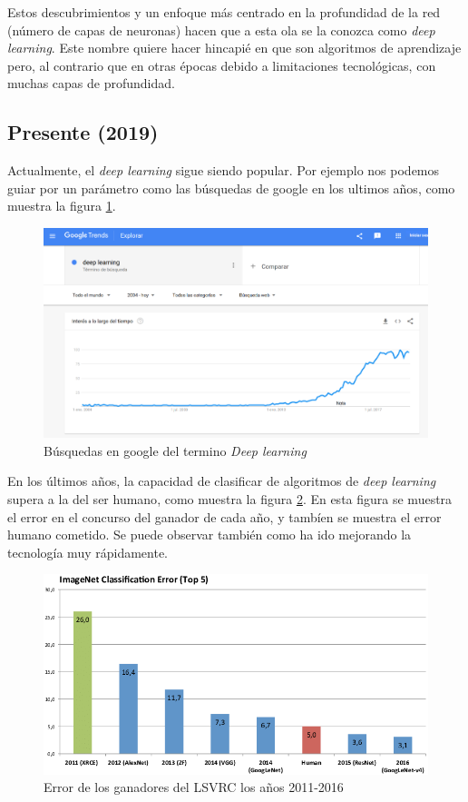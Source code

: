 \documentclass[12pt]{book}
\numberwithin{equation}{section}
\begin{document}
Estos descubrimientos y un enfoque más centrado en la profundidad de la red (número de capas de neuronas) hacen que a esta ola se la conozca como \textit{deep learning}. Este nombre quiere hacer hincapié en que son algoritmos de aprendizaje pero, al contrario que en otras épocas debido a limitaciones tecnológicas, con muchas capas de profundidad.

\subsection{Presente (2019)}

Actualmente, el \textit{deep learning} sigue siendo popular. Por ejemplo nos podemos guiar por un parámetro como las búsquedas de google en los ultimos años, como muestra la figura \ref{fig:growth}.

\begin{figure}[h]
    \centering
    \includegraphics[width=1\textwidth]{growth.png}
    \caption{Búsquedas en google del termino \textit{Deep learning}}
    \label{fig:growth}
\end{figure}

En los últimos años, la capacidad de clasificar de algoritmos de \textit{deep learning} supera a la del ser humano\cite{DBLP:journals/corr/YangH15}, como muestra la figura \ref{fig:errorLSVRC}. En esta figura se muestra el error en el concurso del ganador de cada año, y tambíen se muestra el error humano cometido. Se puede observar también como ha ido mejorando la tecnología muy rápidamente.


\begin{figure}[h]
    \centering
    \includegraphics[width=1\textwidth]{Winner-results-of-the-ImageNet-large-scale-visual-recognition-challenge-LSVRC-of-the.png}
    \caption{Error de los ganadores del LSVRC los años 2011-2016}
    \label{fig:errorLSVRC}
\end{figure}
\end{document}
